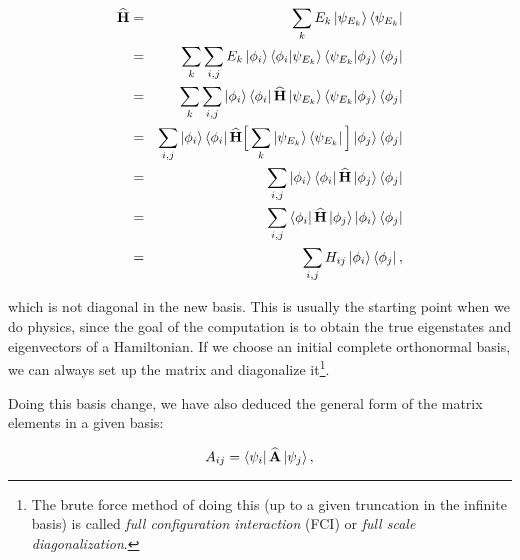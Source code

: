 \begin{eqnarray}
 {\bf\widehat{H}} &=& \sum_{k} E_k\left| \psi_{E_k} \right>\left< \psi_{E_k} \right|                                                                        \nonumber   \\ 
        &=& \sum_{k}\sum_{i,j} E_k \left| \phi_i \right>\left\langle \phi_i | \psi_{E_k}\right\rangle\left\langle \psi_{E_k} | \phi_j\right\rangle\left< \phi_j \right|               \nonumber   \\
        &=& \sum_{k}\sum_{i,j} \left| \phi_i \right>\left< \phi_i \right|{\bf\widehat{H}}\left| \psi_{E_k} \right>\left\langle \psi_{E_k} | \phi_j\right\rangle\left< \phi_j \right|            \nonumber   \\
        &=& \sum_{i,j} \left| \phi_i \right>\left< \phi_i \right|{\bf\widehat{H}}\Big[\sum_{k}\left| \psi_{E_k} \right>\left< \psi_{E_k} \right|\Big]\left| \phi_j \right>\left< \phi_j \right| \nonumber   \\
        &=& \sum_{i,j} \left| \phi_i \right>\left< \phi_i \right|{\bf\widehat{H}}\left| \phi_j \right>\left< \phi_j \right|                                                   \nonumber   \\
        &=& \sum_{i,j} \left< \phi_i \right|{\bf\widehat{H}}\left| \phi_j \right>\left| \phi_i \right>\left< \phi_j \right|                                                   \nonumber   \\
        &=& \sum_{i,j} H_{ij}\left| \phi_i \right>\left< \phi_j \right|,
\end{eqnarray}

which is not diagonal in the new basis. This is usually the starting point when we do physics, since the goal of the computation is to obtain the true eigenstates and eigenvectors of a Hamiltonian. If we choose an initial complete orthonormal basis, we can always set up the matrix and diagonalize it\footnote{The brute force method of doing this (up to a given truncation in the infinite basis) is called \textit{full configuration interaction} (FCI) or \textit{full scale diagonalization}.}. 

Doing this basis change, we have also deduced the general form of the matrix elements in a given basis:

\begin{equation}
 A_{ij} = \left< \psi_i \right| {\bf\widehat{A}} \left| \psi_j \right>,
\end{equation}

